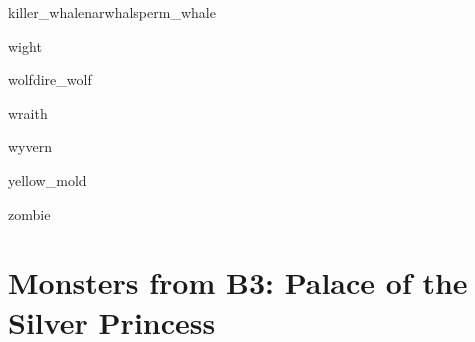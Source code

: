 \documentclass[a4paper,serif]{module}
\begin{document}

\begin{newmonster3}{killer_whale}{narwhal}{sperm_whale}\end{newmonster3}

\begin{newmonster}{wight}\end{newmonster}


\begin{newmonster2}{wolf}{dire_wolf}\end{newmonster2}

\begin{newmonster}{wraith}\end{newmonster}

\begin{newmonster}{wyvern}\end{newmonster}

\begin{newmonster}{yellow_mold}\end{newmonster}

\begin{newmonster}{zombie}\end{newmonster}

\part{Monsters from B3: Palace of the Silver Princess}
\end{document}
